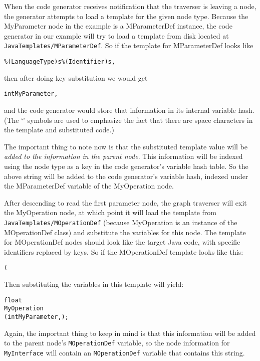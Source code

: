 When the code generator receives notification that the traverser is leaving a
node, the generator attempts to load a template for the given node type. Because
the MyParameter node in the example is a MParameterDef instance, the code
generator in our example will try to load a template from disk located at {\tt
JavaTemplates/MParameterDef}. So if the template for MParameterDef looks like
\begin{small}
\begin{alltt}
\%(LanguageType)s\textvisiblespace\%(Identifier)s,\textvisiblespace
\end{alltt}
\end{small}
then after doing key substitution we would get
\begin{small}
\begin{alltt}
int{\textvisiblespace}MyParameter,\textvisiblespace
\end{alltt}
\end{small}
and the code generator would store that information in its internal variable
hash. (The `\textvisiblespace' symbols are used to emphasize the fact that there
are space characters in the template and substituted code.)

The important thing to note now is that the substituted template value will be
{\it added to the information in the parent node\/}. This information will be
indexed using the node type as a key in the code generator's variable hash
table. So the above string will be added to the code generator's variable hash,
indexed under the MParameterDef variable of the MyOperation node.

After descending to read the first parameter node, the graph traverser will exit
the MyOperation node, at which point it will load the template from {\tt
JavaTemplates/MOperationDef} (because MyOperation is an instance of the
MOperationDef class) and substitute the variables for this node. The template
for MOperationDef nodes should look like the target Java code, with specific
identifiers replaced by keys. So if the MOperationDef template looks like this:
\begin{small}
\begin{alltt}
  %(LanguageType)s
  %(Identifier)s
    ( %(MParameterDef)s );
\end{alltt}
\end{small}
Then substituting the variables in this template will yield:
\begin{small}
\begin{alltt}
  float
  MyOperation
    ( int MyParameter, );
\end{alltt}
\end{small}
Again, the important thing to keep in mind is that this information will be
added to the parent node's {\tt MOperationDef} variable, so the node information
for {\tt MyInterface} will contain an {\tt MOperationDef} variable that contains
this string.

